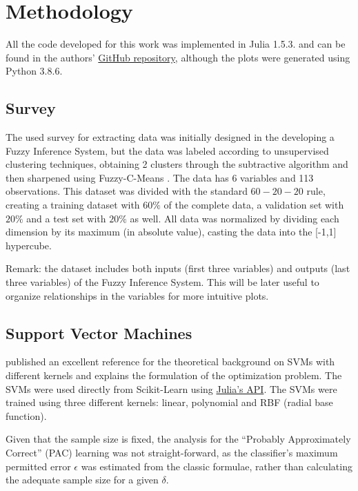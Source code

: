 \documentclass[conference]{IEEEtran}
\theoremstyle{definition}
\theoremstyle{remark}
\theoremstyle{remark}
\begin{document}
\section{Methodology}\label{sec:meth}
All the code developed for this work was implemented in Julia 1.5.3. and
can be found in the authors'
\href{https://github.com/juanscr/ai-works}{GitHub repository}, although the
plots were generated using Python 3.8.6.

\subsection{Survey}
The used survey for extracting data was initially designed in the developing a
Fuzzy Inference System, but the data was labeled according to unsupervised
clustering techniques, obtaining 2 clusters through the subtractive algorithm
\parencite{chiu1994} and then sharpened using Fuzzy-C-Means
\parencite{dunn1973}. The data has 6 variables and 113 observations. This
dataset was divided with the standard $60-20-20$ rule, creating a training
dataset with $60\%$ of the complete data, a validation set with $20\%$ and a
test set with $20\%$ as well. All data was normalized by dividing each dimension
by its maximum (in absolute value), casting the data into the [-1,1] hypercube.

Remark: the dataset includes both inputs (first three variables) and outputs
(last three variables) of the Fuzzy Inference System. This will be later useful
to organize relationships in the variables for more intuitive plots.

\subsection{Support Vector Machines}
\textcite{burges1998} published an excellent reference for the theoretical
background on SVMs with different kernels and explains the formulation of the
optimization problem. The SVMs were used directly from Scikit-Learn
\parencite{scikit-learn, sklearn_api} using
\href{https://bit.ly/3lDHADX}{Julia's API}. The SVMs were trained using three
different kernels: linear, polynomial and RBF (radial base function).

Given that the sample size is fixed, the analysis for the ``Probably
Approximately Correct'' (PAC) learning was not straight-forward, as the
classifier's maximum permitted error $\epsilon$ was estimated from the classic
formulae, rather than calculating the adequate sample size for a given $\delta$.
\end{document}
